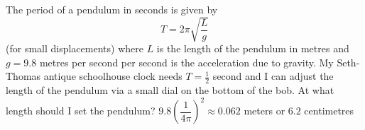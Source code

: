 {\label{pendulumproblem} The period of a pendulum in seconds is given by \[T = 2\pi \sqrt{\dfrac{L}{g}}\](for small displacements) where $L$ is the length of the pendulum in metres and $g = 9.8$ metres per second per second is the acceleration due to gravity.  My Seth-Thomas antique schoolhouse clock needs $T = \frac{1}{2}$ second and I can adjust the length of the pendulum via a small dial on the bottom of the bob.  At what length should I set the pendulum?}
{$9.8 \left(\dfrac{1}{4\pi}\right)^{2} \approx 0.062$ meters or $6.2$ centimetres}